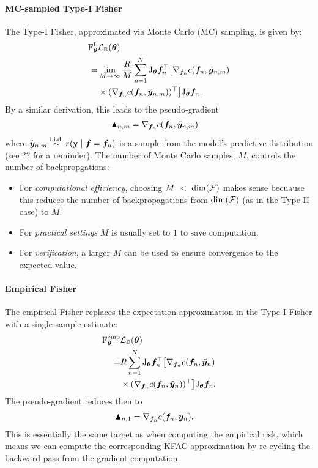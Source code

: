 \paragraph{MC-sampled Type-I Fisher}
The Type-I Fisher, approximated via Monte Carlo (MC) sampling, is given by:
\begin{align*}
\mathrm{F}^{\text{I}}_{{\bm{\theta}}} &{\mathcal{L}}_{{\mathbb{D}}}({\bm{\theta}}) \\
=& \lim_{M \to \infty}
  \frac{R}{M} \sum_{n=1}^N
  \mathrm{J}_{{\bm{\theta}}} {\bm{f}}_n^{\top}
  \big[
  \nabla_{{\bm{f}}_n} c({\bm{f}}_n, \tilde{{\bm{y}}}_{n,m}) \\
& \times (\nabla_{{\bm{f}}_n} c({\bm{f}}_n, \tilde{{\bm{y}}}_{n,m}))^{\top}
\big]
\mathrm{J}_{{\bm{\theta}}} {\bm{f}}_n.
\end{align*}
By a similar derivation, this leads to the pseudo-gradient
\begin{align*}
  \blacktriangle_{n,m}
  &= \nabla_{{\bm{f}}_n}  c({\bm{f}}_n, \tilde{{\bm{y}}}_{n,m})
\end{align*}
where $\tilde{\vy}_{n,m} \stackrel{\text{\iid}}{\sim} r(\rvy \mid \vf = \vf_n)$ is a sample from the model's predictive distribution (see ?? for a reminder).
The number of Monte Carlo samples, $M$, controls the number of backpropgations:
\begin{itemize}
 \item For \emph{computational efficiency}, choosing $M~<~\dim({\mathcal{F}})$ makes sense becuause this reduces the number of backpropagations from $\dim({\mathcal{F}})$ (as in the Type-II case) to $M$.
 \item For \emph{practical settings} $M$ is usually set to $1$ to save computation.
 \item For \emph{verification}, a larger $M$ can be used to ensure convergence to the expected value.
\end{itemize}

\paragraph{Empirical Fisher}
The empirical Fisher replaces the expectation approximation in the Type-I Fisher with a single-sample estimate:
\begin{align*}
  \mathrm{F}_{\bm{\theta}}^{\text{emp}} &{\mathcal{L}}_{{\mathbb{D}}}({\bm{\theta}}) \\
  =&R \sum_{n=1}^N
      \mathrm{J}_{{\bm{\theta}}} {\bm{f}}_n^{\top}
      \big[
      \nabla_{{\bm{f}}_n} c({\bm{f}}_n, \tilde{{\bm{y}}}_{n}) \\
  &\times (\nabla_{{\bm{f}}_n} c({\bm{f}}_n, \tilde{{\bm{y}}}_{n}))^{\top}
    \big] \mathrm{J}_{{\bm{\theta}}} {\bm{f}}_n.
\end{align*}
The pseudo-gradient reduces then to
\begin{align*}
  \blacktriangle_{n,1}
  &= \nabla_{{\bm{f}}_n}  c({\bm{f}}_n, {\bm{y}}_n).
\end{align*}
This is essentially the same target as when computing the empirical risk, which means we can compute the corresponding KFAC approximation by re-cycling the backward pass from the gradient computation.

